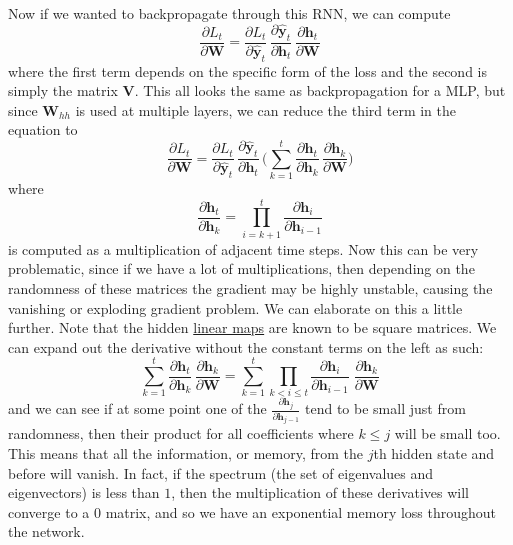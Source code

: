 \documentclass{article}
\begin{document}
    Now if we wanted to backpropagate through this RNN, we can compute 
    \begin{equation}
      \frac{\partial L_t}{\partial \mathbf{W}} = \frac{\partial L_t}{\partial \hat{\mathbf{y}}_t} \, \frac{\partial \hat{\mathbf{y}}_t}{\partial \mathbf{h}_t} \, \frac{\partial \mathbf{h}_t}{\partial \mathbf{W}}
    \end{equation}
    where the first term depends on the specific form of the loss and the second is simply the matrix $\mathbf{V}$. This all looks the same as backpropagation for a MLP, but since $\mathbf{W}_{hh}$ is used at multiple layers, we can reduce the third term in the equation to 
    \begin{equation}
      \frac{\partial L_t}{\partial \mathbf{W}} = \frac{\partial L_t}{\partial \hat{\mathbf{y}}_t} \, \frac{\partial \hat{\mathbf{y}}_t}{\partial \mathbf{h}_t} \, \bigg(\sum_{k=1}^t \frac{\partial \mathbf{h}_t}{\partial \mathbf{h}_k} \, \frac{\partial \mathbf{h}_k}{\partial \mathbf{W}} \bigg)
    \end{equation}
    where 
    \begin{equation}
      \frac{\partial \mathbf{h}_t}{\partial \mathbf{h}_k}  = \prod_{i=k+1}^{t} \frac{\partial \mathbf{h}_i}{\partial \mathbf{h}_{i-1}}
    \end{equation}
    is computed as a multiplication of adjacent time steps. Now this can be very problematic, since if we have a lot of multiplications, then depending on the randomness of these matrices the gradient may be highly unstable, causing the vanishing or exploding gradient problem. We can elaborate on this a little further. Note that the hidden \hyperref[lin-def:linear_map]{linear maps} are known to be square matrices. We can expand out the derivative without the constant terms on the left as such: 
    \begin{equation}
      \sum_{k=1}^t \frac{\partial \mathbf{h}_t}{\partial \mathbf{h}_k} \, \frac{\partial \mathbf{h}_k}{\partial \mathbf{W}} = \sum_{k=1}^t \prod_{k < i \leq t} \frac{\partial \mathbf{h}_i}{\partial \mathbf{h}_{i-1}} \; \frac{\partial \mathbf{h}_k}{\partial \mathbf{W}}
    \end{equation}
    and we can see if at some point one of the $\frac{\partial \mathbf{h}_j}{\partial \mathbf{h}_{j-1}}$ tend to be small just from randomness, then their product for all coefficients where $k \leq j$ will be small too. This means that all the information, or memory, from the $j$th hidden state and before will vanish. In fact, if the spectrum (the set of eigenvalues and eigenvectors) is less than $1$, then the multiplication of these derivatives will converge to a $0$ matrix, and so we have an exponential memory loss throughout the network. 
\end{document}
